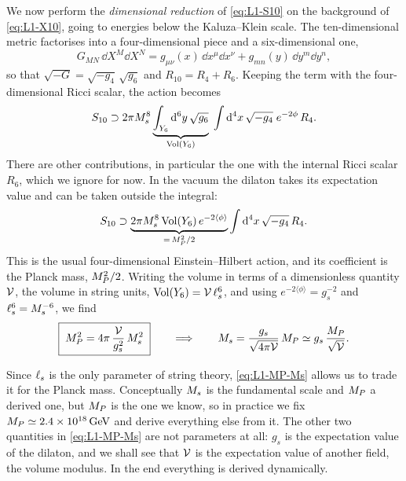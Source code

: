 We now perform the \emph{dimensional reduction} of \cref{eq:L1-S10} on the background of \cref{eq:L1-X10}, going to energies below the Kaluza--Klein scale. The ten-dimensional metric factorises into a four-dimensional piece and a six-dimensional one,
\begin{equation}
  G_{MN}\,\dd X^M\dd X^N = g_{\mu\nu}(x)\,\dd x^\mu\dd x^\nu + g_{mn}(y)\,\dd y^m\dd y^n ,
  \label{eq:L1-ansatz}
\end{equation}
so that $\sqrt{-G} = \sqrt{-g_4}\,\sqrt{g_6}$ and $R_{10} = R_4 + R_6$. Keeping the term with the four-dimensional Ricci scalar, the action becomes
\begin{equation}
  S_{10} \supset 2\pi M_{s}^8\underbrace{\int_{Y_6}\mathrm{d}^6y\,\sqrt{g_6}}_{\mathrm{Vol}(Y_6)}\;\int\mathrm{d}^4x\,\sqrt{-g_4}\;e^{-2\phi}\,R_4 .
  \label{eq:L1-reduction}
\end{equation}
There are other contributions, in particular the one with the internal Ricci scalar $R_6$, which we ignore for now.
In the vacuum the dilaton takes its expectation value and can be taken outside the integral:
\begin{equation}
  S_{10} \supset \underbrace{2\pi M_{s}^8\,\mathrm{Vol}(Y_6)\,e^{-2\langle\phi\rangle}}_{=\,M_{P}^2/2}\int\mathrm{d}^4x\,\sqrt{-g_4}\,R_4 .
  \label{eq:L1-vacuum}
\end{equation}
This is the usual four-dimensional Einstein--Hilbert action, and its coefficient is the Planck mass, $M_{P}^2/2$. Writing the volume in terms of a dimensionless quantity $\mathcal{V}$, the volume in string units, $\mathrm{Vol}(Y_6) = \mathcal{V}\,\ell_s^6$, and using $e^{-2\langle\phi\rangle} = g_s^{-2}$ and $\ell_s^6 = M_{s}^{-6}$, we find
\begin{equation}
  \boxed{\;M_{P}^2 = 4\pi\,\frac{\mathcal{V}}{g_s^2}\,M_{s}^2\;}
  \qquad\Longrightarrow\qquad
  M_{s} = \frac{g_s}{\sqrt{4\pi\mathcal{V}}}\,M_{P} \simeq g_s\,\frac{M_{P}}{\sqrt{\mathcal{V}}} .
  \label{eq:L1-MP-Ms}
\end{equation}

Since $\ell_s$ is the only parameter of string theory, \cref{eq:L1-MP-Ms} allows us to trade it for the Planck mass. Conceptually $M_{s}$ is the fundamental scale and $M_{P}$ a derived one, but $M_{P}$ is the one we know, so in practice we fix $M_{P}\simeq2.4\times10^{18}\,\mathrm{GeV}$ and derive everything else from it. The other two quantities in \cref{eq:L1-MP-Ms} are not parameters at all: $g_s$ is the expectation value of the dilaton, and we shall see that $\mathcal{V}$ is the expectation value of another field, the volume modulus. In the end everything is derived dynamically.

